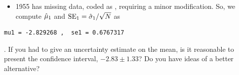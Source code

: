 \begin{frame}[fragile]

\begin{itemize}

\item 1955 has missing data, coded as , requiring a minor modification. So, we compute $\hat\mu_1$ and $\mathrm{SE}_1=\hat\sigma_1/\sqrt{N}$ as

\end{itemize}

\begin{knitrout}\small
{}\color{fgcolor}\begin{kframe}
\begin{alltt}
 \hlkwb{<-} \hlopt{$}\hldef{=}\hldef{)}
 \hlkwb{<-} \hlopt{$}\hldef{=}\hldef{)}\hlopt{/}\hldef{(}\hldef{(}\hlopt{!}\hlopt{$}
\hldef{(}  \hldef{)}
\end{alltt}
\begin{verbatim}
mu1 = -2.829268 ,  se1 = 0.6767317 
\end{verbatim}
\end{kframe}
\end{knitrout}

\myquestion. If you had to give an uncertainty estimate on the mean, is it reasonable to present the confidence interval, $-2.83 \pm 1.33$? Do you have ideas of a better alternative?

\answer{\vspace{2.5cm}}{}


\end{frame}

